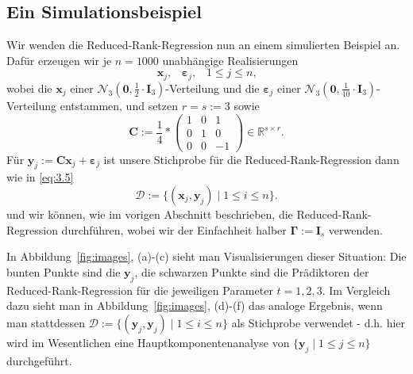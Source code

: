 \documentclass[]{article}
\newcommand{\R}{\mathbb{R}}
\newcommand{\C}{\mathbf{C}}
\newcommand{\Ggamma}{\mathbf{\Gamma}}
\newcommand{\xx}{\mathbf{x}}
\newcommand{\yy}{\mathbf{y}}
\begin{document}
\subsection*{Ein Simulationsbeispiel}
Wir wenden die Reduced-Rank-Regression nun an einem simulierten Beispiel an. Dafür erzeugen wir je $n=1000$ unabhängige Realisierungen 
$$\xx_j\text{,} \quad \bm{\varepsilon}_j \text{,}\quad 1 \leq j \leq n \text{,}$$
wobei die $\xx_j$ einer $\mathcal{N}_3(\mathbf{0}, \frac{1}{2} \cdot \mathbf{I}_3)$-Verteilung und die $\bm{\varepsilon}_j$ einer $\mathcal{N}_3(\mathbf{0}, \frac{1}{10} \cdot \mathbf{I}_3)$-Verteilung entstammen, und setzen $r=s:=3$ sowie
$$\C := \frac{1}{4} * \begin{pmatrix}
1 & 0 & 1 \\
0 & 1 & 0 \\
0 & 0 & -1
\end{pmatrix} \in \R^{s \times r} \text{.}$$
Für $\yy_j := \C \xx_j + \bm{\varepsilon}_j$ ist unsere Stichprobe für die Reduced-Rank-Regression dann wie in \eqref{eq:3.5}
\[\mathcal{D} := \{(\xx_j, \yy_j) \;|\; 1 \leq i \leq n\}\text{.}\]
und wir können, wie im vorigen Abschnitt beschrieben, die Reduced-Rank-Regression durchführen, wobei wir der Einfachheit halber $\Ggamma := \mathbf{I}_s$ verwenden.

In Abbildung~\ref{fig:images}, (a)-(c) sieht man Visualisierungen dieser Situation: Die bunten Punkte sind die $\yy_j$, die schwarzen Punkte sind die Prädiktoren der Reduced-Rank-Regression für die jeweiligen Parameter $t = 1,2,3$. Im Vergleich dazu sieht man in Abbildung~\ref{fig:images}, (d)-(f) das analoge Ergebnis, wenn man stattdessen $\mathcal{D} := \{(\yy_j, \yy_j) \;|\; 1 \leq i \leq n\}$ als Stichprobe verwendet - d.h. hier wird im Wesentlichen eine Hauptkomponentenanalyse von $\{\yy_j \;|\; 1 \leq j \leq n\}$ durchgeführt.
\end{document}
